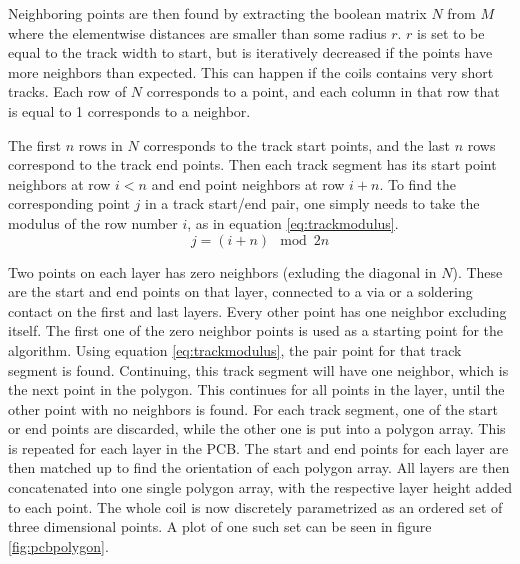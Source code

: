 Neighboring points are then found by extracting the boolean matrix $N$
from $M$ where the elementwise distances are smaller than some radius $r$.
$r$ is set to be equal to the track width to start, but is iteratively
decreased if the points have more neighbors than expected. This can happen
if the coils contains very short tracks. Each row of $N$ corresponds to
a point, and each column in that row that is equal to 1 corresponds to a
neighbor.

The first $n$ rows in $N$ corresponds to the track
start points, and the last $n$ rows correspond to the track end points.
Then each track segment has its start point neighbors at row $i<n$ and end
point neighbors at row $i+n$. To find the corresponding point $j$ in a track
start/end pair, one simply needs to take the modulus of the row number $i$,
as in equation \ref{eq:trackmodulus}.
\begin{equation}
    j = (i+n)\mod 2n
    \label{eq:trackmodulus}
\end{equation}

Two points on each layer has zero neighbors (exluding the diagonal in
$N$). These are the start and end
points on that layer, connected to a via or a soldering contact on the
first and last layers. Every other point has one neighbor excluding
itself.
The first one of the zero neighbor points is used as a starting point
for the algorithm. Using equation \ref{eq:trackmodulus}, the pair
point for that track segment is found. Continuing, this track segment
will have one neighbor, which is the next point in the polygon. This
continues for all points in the layer, until the other point with no
neighbors is found. For each track segment, one of the start or
end points are discarded, while the other one is put into a polygon
array. This is repeated for each layer in the PCB. The start and end
points for each layer are then matched up to find the orientation
of each polygon array. All layers are then concatenated into one
single polygon array, with the respective layer height added to
each point. The whole coil is now discretely parametrized as an
ordered set of three dimensional points. A plot of one such
set can be seen in figure \ref{fig:pcbpolygon}.

